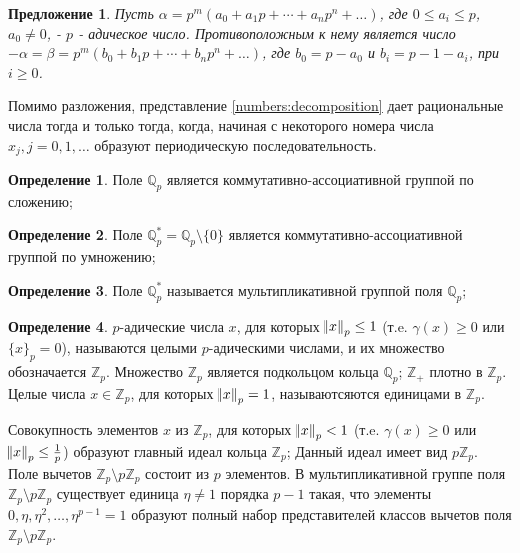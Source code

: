 \documentclass[master, och, diploma, times]{sty/SCWorks}
\theoremstyle{plain}
\newtheorem{proposition}{Предложение}[section]
\theoremstyle{definition}
\newtheorem{defn}{Определение}[section]
\begin{document}
\begin{proposition}
Пусть $\alpha=p^m(a_0+a_1p+\cdots +a_np^n+\dots)$, где $0 \le a_i \le p$, $a_0 \neq 0$, - $p$ - адическое число. Противоположным к нему является число $- \alpha=\beta=p^m(b_0+b_1p+\cdots+b_np^n+\dots)$, где $b_0=p-a_0$ и $b_i=p-1-a_i$, при $i \geq 0$.
\end{proposition}\label{adic:pros:minus}

Помимо разложения, представление \eqref{numbers:decomposition} дает рациональные числа тогда и только тогда, когда, начиная с некоторого номера числа $x_j, j=0,1,\dots$ образуют периодическую последовательность.

\begin{defn}
Поле $\mathbb {Q}_p$ является коммутативно-ассоциативной группой по сложению;
\end{defn}

\begin{defn}
Поле $\mathbb {Q}_p^*=\mathbb {Q}_p \setminus \{0\}$ является коммутативно-ассоциативной группой по умножению;
\end{defn}

\begin{defn}
Поле $\mathbb {Q}_p^*$ называется мультипликативной группой поля $\mathbb {Q}_p$\cite{bib:analysis:baker};
\end{defn}

\begin{defn}
$p$-адические числа $x$, для которых $\norm{x}_p \le 1$ (т.e. $\gamma(x) \ge 0$ или $\{x\}_p=0$), называются целыми $p$-адическими числами, и их множество обозначается $\mathbb {Z}_p$. Множество $\mathbb {Z}_p$ является подкольцом кольца $\mathbb {Q}_p$; $\mathbb {Z}_+$ плотно в $\mathbb {Z}_p$. Целые числа $x \in \mathbb {Z}_p$, для которых $\norm{x}_p=1$, называютсяются единицами в $\mathbb {Z}_p$. \cite{bib:analysis:vladimirov}
\end{defn}

Совокупность элементов $x$ из $\mathbb {Z}_p$, для которых $\norm{x}_p < 1$ (т.e. $\gamma(x) \ge 0$ или $\norm{x}_p \le \frac{1}{p}$) образуют главный идеал кольца $\mathbb {Z}_p$; Данный идеал имеет вид $p\mathbb {Z}_p$. Поле вычетов $\mathbb {Z}_p \setminus p\mathbb {Z}_p$ состоит из $p$ элементов. В мультипликативной группе поля $\mathbb {Z}_p \setminus p\mathbb {Z}_p$ существует единица $\eta \ne 1$ порядка $p-1$ такая, что элементы $0, \eta, \eta^2, \dots, \eta^{p-1} = 1$ образуют полный набор представителей классов вычетов поля $\mathbb {Z}_p \setminus p\mathbb {Z}_p$.
\end{document}
